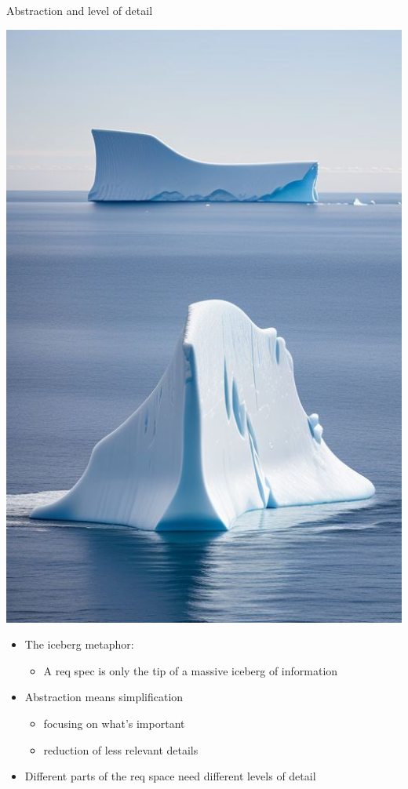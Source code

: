 \begin{Slide}{Abstraction and level of detail}

\begin{minipage}[t]{0.4\textwidth}
\vspace{-1.0em}\includegraphics[width=1.0\textwidth]{../img/iceberg4}
\end{minipage}%
\begin{minipage}[t]{0.6\textwidth}
\begin{itemize}
\item The iceberg metaphor: 
\begin{itemize}
\item A req spec is only the tip of a massive iceberg of information
\end{itemize}
\item Abstraction means simplification
\begin{itemize}
\item focusing on what's important 
\item reduction of less relevant details
\end{itemize}
\item Different parts of the req space need different levels of detail
\end{itemize}
\end{minipage}%

\end{Slide}
